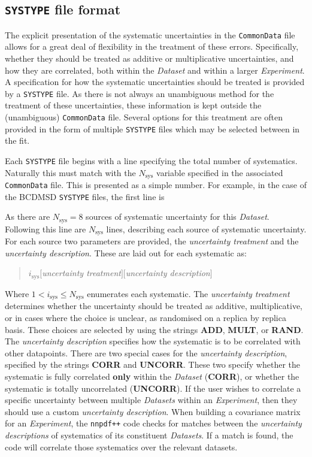 \documentclass[11pt]{article}
\begin{document}
\subsection{{\tt SYSTYPE} file format}
The explicit presentation of the systematic uncertainties in the {\tt CommonData} file allows for a great deal of flexibility in the treatment of these errors. Specifically, whether they should be treated as additive or multiplicative uncertainties, and how they are correlated, both within the \emph{Dataset} and within a larger \emph{Experiment}. A specification for how the systematic uncertainties should be treated is provided by a {\tt SYSTYPE} file. As there is not always an unambiguous method for the treatment of these uncertainties, these information is kept outside the (unambiguous) {\tt CommonData} file. Several options for this treatment are often provided in the form of multiple {\tt SYSTYPE} files which may be selected between in the fit.

Each {\tt SYSTYPE} file begins with a line specifying the total number of systematics. Naturally this must match with the $N_{\text{sys}}$ variable specified in the associated {\tt CommonData} file. This is presented as a simple number. For example, in the case of the BCDMSD {\tt SYSTYPE} files, the first line is
\begin{quotation}
\end{quotation}
As there are $N_{\text{sys}}=8$ sources of systematic uncertainty for this \emph{Dataset}. Following this line are $N_{\text{sys}}$ lines, describing each source of systematic uncertainty. For each source two parameters are provided, the \emph{uncertainty treatment} and the \emph{uncertainty description}. These are laid out for each systematic as:
\begin{quotation}\noindent
$i_{\text{sys}}$\quad $[$\emph{uncertainty treatment}$]$\quad $[$\emph{uncertainty description}$]$
\end{quotation}
Where $1< i_{\text{sys}} \leq N_{\mathrm{sys}}$ enumerates each systematic. The \emph{uncertainty treatment} determines whether the uncertainty should be treated as additive, multiplicative, or in cases where the choice is unclear, as randomised on a replica by replica basis. These choices are selected by using the strings \textbf{ADD}, \textbf{MULT}, or \textbf{RAND}. The \emph{uncertainty description} specifies how the systematic is to be correlated with other datapoints. There are two special cases for the \emph{uncertainty description}, specified by the strings \textbf{CORR} and \textbf{UNCORR}. These two specify whether the systematic is fully correlated \textbf{only} within the \emph{Dataset} (\textbf{CORR}), or whether the systematic is totally uncorrelated (\textbf{UNCORR}). If the user wishes to correlate a specific uncertainty between multiple \emph{Datasets} within an \emph{Experiment}, then they should use a custom \emph{uncertainty description}. When building a covariance matrix for an \emph{Experiment}, the {\tt nnpdf++} code checks for matches between the \emph{uncertainty descriptions} of systematics of its constituent \emph{Datasets}. If a match is found, the code will correlate those systematics over the relevant datasets.
\end{document}
